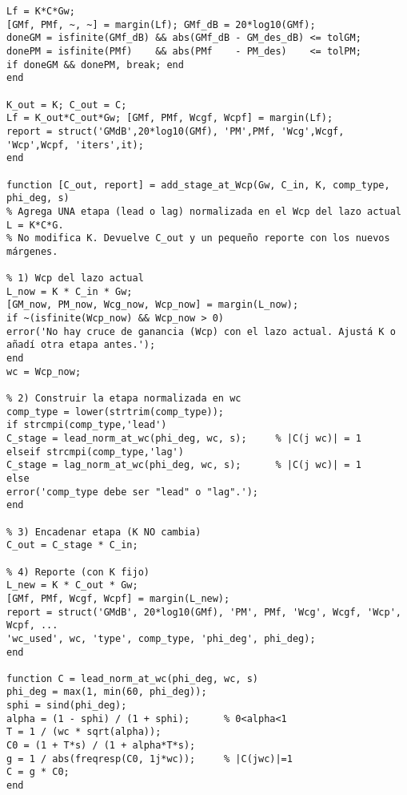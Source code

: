 \begin{lstlisting}[style=matlabstyle,caption={Funciones creadas para este laboratorio.},label={matlab:newfunc}]
% --- (D) Chequeo de convergencia
Lf = K*C*Gw;
[GMf, PMf, ~, ~] = margin(Lf); GMf_dB = 20*log10(GMf);
doneGM = isfinite(GMf_dB) && abs(GMf_dB - GM_des_dB) <= tolGM;
donePM = isfinite(PMf)    && abs(PMf    - PM_des)    <= tolPM;
if doneGM && donePM, break; end
end

K_out = K; C_out = C;
Lf = K_out*C_out*Gw; [GMf, PMf, Wcgf, Wcpf] = margin(Lf);
report = struct('GMdB',20*log10(GMf), 'PM',PMf, 'Wcg',Wcgf, 'Wcp',Wcpf, 'iters',it);
end

function [C_out, report] = add_stage_at_Wcp(Gw, C_in, K, comp_type, phi_deg, s)
% Agrega UNA etapa (lead o lag) normalizada en el Wcp del lazo actual L = K*C*G.
% No modifica K. Devuelve C_out y un pequeño reporte con los nuevos márgenes.

% 1) Wcp del lazo actual
L_now = K * C_in * Gw;
[GM_now, PM_now, Wcg_now, Wcp_now] = margin(L_now);
if ~(isfinite(Wcp_now) && Wcp_now > 0)
error('No hay cruce de ganancia (Wcp) con el lazo actual. Ajustá K o añadí otra etapa antes.');
end
wc = Wcp_now;

% 2) Construir la etapa normalizada en wc
comp_type = lower(strtrim(comp_type));
if strcmpi(comp_type,'lead')
C_stage = lead_norm_at_wc(phi_deg, wc, s);     % |C(j wc)| = 1
elseif strcmpi(comp_type,'lag')
C_stage = lag_norm_at_wc(phi_deg, wc, s);      % |C(j wc)| = 1
else
error('comp_type debe ser "lead" o "lag".');
end

% 3) Encadenar etapa (K NO cambia)
C_out = C_stage * C_in;

% 4) Reporte (con K fijo)
L_new = K * C_out * Gw;
[GMf, PMf, Wcgf, Wcpf] = margin(L_new);
report = struct('GMdB', 20*log10(GMf), 'PM', PMf, 'Wcg', Wcgf, 'Wcp', Wcpf, ...
'wc_used', wc, 'type', comp_type, 'phi_deg', phi_deg);
end

function C = lead_norm_at_wc(phi_deg, wc, s)
phi_deg = max(1, min(60, phi_deg));
sphi = sind(phi_deg);
alpha = (1 - sphi) / (1 + sphi);      % 0<alpha<1
T = 1 / (wc * sqrt(alpha));
C0 = (1 + T*s) / (1 + alpha*T*s);
g = 1 / abs(freqresp(C0, 1j*wc));     % |C(jwc)|=1
C = g * C0;
end

\end{lstlisting}

